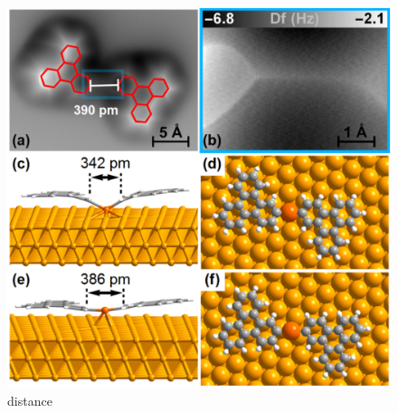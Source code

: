 \documentclass[aps,reprint,amsmath,amssymb]{revtex4-2}
\begin{document}
\begin{figure}[ht]
\centering
\includegraphics[width=0.98\columnwidth]{Fig/distance.png}
\caption{distance}
\label{fig:5}
\end{figure}

\end{document}
